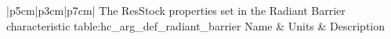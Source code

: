 \begin{customLongTable}{ |p{5cm}|p{3cm}|p{7cm}| }
{The ResStock properties set in the Radiant Barrier characteristic} {table:hc_arg_def_radiant_barrier}
{Name & Units & Description}
\end{customLongTable}
